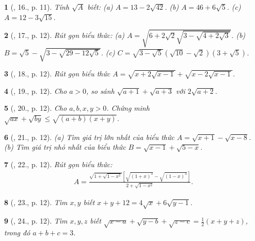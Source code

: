\documentclass{article}
\newtheorem{baitoan}{}
\begin{document}
\begin{baitoan}[\cite{Tuyen_Toan_9_old}, 16., p. 11]
	Tính $\sqrt{A}$ biết: (a) $A = 13 - 2\sqrt{42}$. (b) $A = 46 + 6\sqrt{5}$. (c) $A = 12 - 3\sqrt{15}$.
\end{baitoan}

\begin{baitoan}[\cite{Tuyen_Toan_9_old}, 17., p. 12]
	Rút gọn biểu thức: (a) $A = \sqrt{6 + 2\sqrt{2}\sqrt{3 - \sqrt{4 + 2\sqrt{3}}}}$. (b) $B = \sqrt{5} - \sqrt{3 - \sqrt{29 - 12\sqrt{5}}}$. (c) $C = \sqrt{3 - \sqrt{5}}(\sqrt{10} - \sqrt{2})(3 + \sqrt{5})$.
\end{baitoan}

\begin{baitoan}[\cite{Tuyen_Toan_9_old}, 18., p. 12]
	Rút gọn biểu thức $A = \sqrt{x + 2\sqrt{x - 1}} + \sqrt{x - 2\sqrt{x - 1}}$.
\end{baitoan}

\begin{baitoan}[\cite{Tuyen_Toan_9_old}, 19., p. 12]
	Cho $a > 0$, so sánh $\sqrt{a + 1} + \sqrt{a + 3}$ với $2\sqrt{a + 2}$.
\end{baitoan}

\begin{baitoan}[\cite{Tuyen_Toan_9_old}, 20., p. 12]
	Cho $a,b,x,y > 0$. Chứng minh $\sqrt{ax} + \sqrt{by}\le\sqrt{(a + b)(x + y)}$.
\end{baitoan}

\begin{baitoan}[\cite{Tuyen_Toan_9_old}, 21., p. 12]
	(a) Tìm giá trị lớn nhất của biểu thức $A = \sqrt{x + 1} - \sqrt{x - 8}$. (b) Tìm giá trị nhỏ nhất của biểu thức $B = \sqrt{x - 1} + \sqrt{5 - x}$.
\end{baitoan}

\begin{baitoan}[\cite{Tuyen_Toan_9_old}, 22., p. 12]
	Rút gọn biểu thức:
	\begin{align*}
		A = \frac{\sqrt{1 + \sqrt{1 - x^2}}\left[\sqrt{(1 + x)^3} - \sqrt{(1 - x)^3}\right]}{2 + \sqrt{1 - x^2}}.
	\end{align*}
\end{baitoan}

\begin{baitoan}[\cite{Tuyen_Toan_9_old}, 23., p. 12]
	Tìm $x,y$ biết $x + y + 12 = 4\sqrt{x} + 6\sqrt{y - 1}$.
\end{baitoan}

\begin{baitoan}[\cite{Tuyen_Toan_9_old}, 24., p. 12]
	Tìm $x,y,z$ biết $\sqrt{x - a} + \sqrt{y - b} + \sqrt{z - c} = \frac{1}{2}(x + y + z)$, trong đó $a + b + c = 3$.
\end{baitoan}
\end{document}

